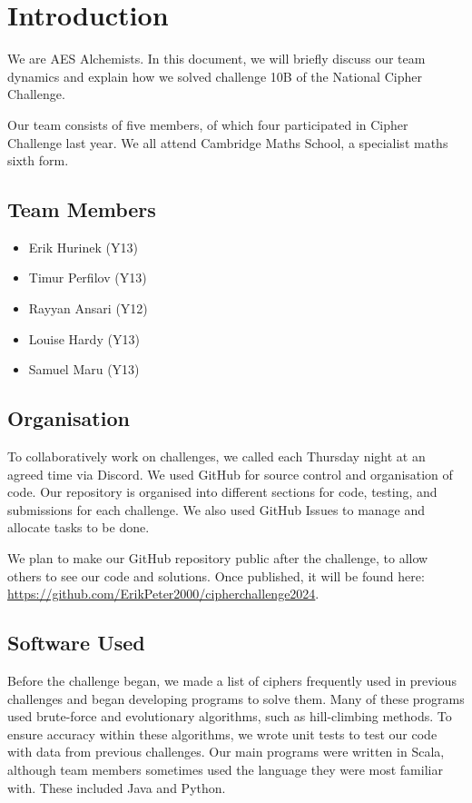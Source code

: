 
\section*{Introduction}

We are AES Alchemists. In this document, we will briefly discuss our team dynamics and explain how we solved challenge 10B of the National Cipher Challenge.

Our team consists of five members, of which four participated in Cipher Challenge last year. We all attend Cambridge Maths School, a specialist maths sixth form.

\subsection*{Team Members}

\begin{itemize}
    \item Erik Hurinek (Y13)
    \item Timur Perfilov (Y13)
    \item Rayyan Ansari (Y12)
    \item Louise Hardy (Y13)
    \item Samuel Maru (Y13)
\end{itemize}

\subsection*{Organisation}

To collaboratively work on challenges, we called each Thursday night at an agreed time via Discord. We used GitHub for source control and organisation of code. Our repository is organised into different sections for code, testing, and submissions for each challenge. We also used GitHub Issues to manage and allocate tasks to be done.

We plan to make our GitHub repository public after the challenge, to allow others to see our code and solutions. Once published, it will be found here: \url{https://github.com/ErikPeter2000/cipherchallenge2024}.

\subsection*{Software Used}

Before the challenge began, we made a list of ciphers frequently used in previous challenges and began developing programs to solve them. Many of these programs used brute-force and evolutionary algorithms, such as hill-climbing methods. To ensure accuracy within these algorithms, we wrote unit tests to test our code with data from previous challenges. Our main programs were written in Scala, although team members sometimes used the language they were most familiar with. These included Java and Python.